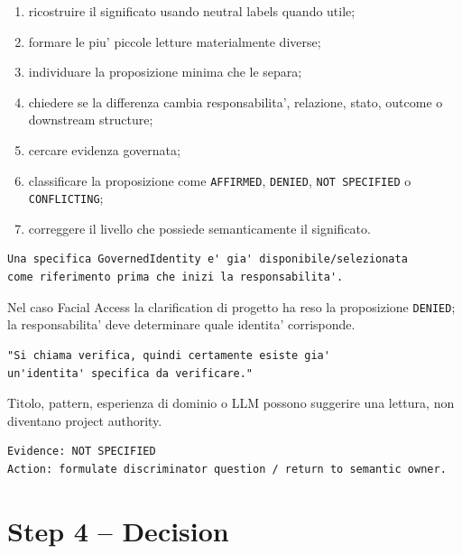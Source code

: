 \documentclass[11pt,a4paper]{article}
\newcommand{\code}[1]{\texttt{#1}}
\begin{document}
\begin{enumerate}
\item ricostruire il significato usando neutral labels quando utile;
\item formare le piu' piccole letture materialmente diverse;
\item individuare la proposizione minima che le separa;
\item chiedere se la differenza cambia responsabilita', relazione, stato, outcome o downstream structure;
\item cercare evidenza governata;
\item classificare la proposizione come \code{AFFIRMED}, \code{DENIED}, \code{NOT SPECIFIED} o \code{CONFLICTING};
\item correggere il livello che possiede semanticamente il significato.
\end{enumerate}

\begin{examplebox}
\begin{lstlisting}
Una specifica GovernedIdentity e' gia' disponibile/selezionata
come riferimento prima che inizi la responsabilita'.
\end{lstlisting}
Nel caso Facial Access la clarification di progetto ha reso la proposizione \code{DENIED}; la responsabilita' deve determinare quale identita' corrisponde.
\end{examplebox}

\begin{badbox}
\begin{lstlisting}
"Si chiama verifica, quindi certamente esiste gia'
un'identita' specifica da verificare."
\end{lstlisting}
Titolo, pattern, esperienza di dominio o LLM possono suggerire una lettura, non diventano project authority.
\end{badbox}

\begin{goodbox}
\begin{lstlisting}
Evidence: NOT SPECIFIED
Action: formulate discriminator question / return to semantic owner.
\end{lstlisting}
\end{goodbox}

\section{Step 4 -- Decision}
\end{document}
